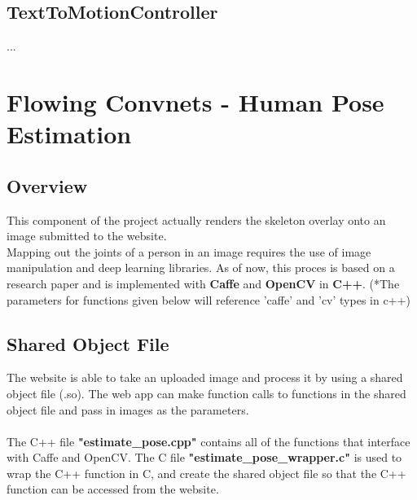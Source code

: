 \documentclass{scrreprt}
\begin{document}
\subsection{TextToMotionController}

...

\break

\section{Flowing Convnets - Human Pose Estimation}

\subsection{Overview}

This component of the project actually renders the skeleton overlay onto an image submitted to the website.
\\
Mapping out the joints of a person in an image requires the use of image manipulation and deep learning libraries. As of now, this proces is based on a research paper and is implemented with \textbf{Caffe} and \textbf{OpenCV} in \textbf{C++}. (*The parameters for functions given below will reference 'caffe' and 'cv' types in c++)


\subsection{Shared Object File}

The website is able to take an uploaded image and process it by using a shared object file (.so). The web app can make function calls to functions in the shared object file and pass in images as the parameters.
\\\\
The C++ file \textbf{"estimate\_pose.cpp"} contains all of the functions that interface with Caffe and OpenCV. The C file \textbf{"estimate\_pose\_wrapper.c"} is used to wrap the C++ function in C, and create the shared object file so that the C++ function can be accessed from the website.
\end{document}
